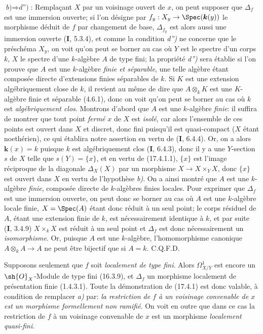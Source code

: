 $\textit{b)}\Rightarrow\textit{d'')}$: Remplaçant $X$ par un voisinage ouvert de $x$, on peut supposer que $\Delta_f$ est une immersion ouverte; si l'on désigne par $f_y:X_y\to\Spec(\boldsymbol{k}(y))$ le morphisme déduit de $f$ par changement de base, $\Delta_{f_y}$ est alors aussi une immersion ouverte (\textbf{I}, 5.3.4), et comme la condition \emph{d'')} ne concerne que le préschéma $X_y$, on voit qu'on peut se borner au cas où $Y$ est le spectre d'un corps $k$, $X$ le spectre d'une $k$-algèbre $A$ de type fini; la propriété \emph{d'')} sera établie si l'on prouve que $A$ est une $k$-algèbre \emph{finie et séparable}, une telle algèbre étant composée directe d'extensions finies séparables de $k$. Si $K$ est une extension algébriquement close de $k$, il revient au même de dire que $A\otimes_k K$ est une $K$-algèbre finie et séparable (4.6.1), donc on voit qu'on peut se borner au cas où $k$ est \emph{algébriquement clos}. Montrons d'abord que $A$ est une $k$-algèbre \emph{finie}: il suffira de montrer que tout point \emph{fermé} $x$ de $X$ est \emph{isolé}, car alors l'ensemble de ces points est ouvert dans $X$ et discret, donc fini puisqu'il est quasi-compact ($X$ étant noethérien), ce qui établira notre assertion en vertu de (\textbf{I}, 6.4.4). Or, on a alors $\boldsymbol{k}(x)=k$ puisque $k$ est algébriquement clos (\textbf{I}, 6.4.3), donc il y a une $Y$-section $s$ de $X$ telle que $s(Y)=\{x\}$, et en vertu de (17.4.1.1), $\{x\}$ est l'image réciproque de la diagonale $\Delta_X(X)$ par un morphisme $X\to X\times_Y X$, donc $\{x\}$ est ouvert dans $X$ en vertu de l'hypothèse \emph{b)}. On a ainsi montré que $A$ est une
$k$-algèbre \emph{finie}, composée directe de $k$-algèbres finies locales. Pour exprimer que $\Delta_f$ est une immersion ouverte, on peut donc se borner au cas où $A$ est une $k$-algèbre locale finie, $X=\Spec(A)$ étant donc réduit à un seul point; le corps résiduel de $A$, étant une extension finie de $k$, est nécessairement identique à $k$, et par suite (\textbf{I}, 3.4.9) $X\times_k X$ est réduit à un seul point et $\Delta_f$ est donc nécessairement un \emph{isomorphisme}. Or, puisque $A$ est une $k$-algèbre, l'homomorphisme canonique $A\otimes_k A\to A$ ne peut être bijectif que si $A=k$. C.Q.F.D.

\begin{remark}[17.4.1.2]
\label{IV.17.4.1.2}
Supposons seulement que $f$ soit \emph{localement de type fini}. Alors $\varOmega^1_{X/Y}$ est encore un $\sh{O}_X$-Module de type fini (16.3.9), et $\Delta_f$ un morphisme localement de présentation finie (1.4.3.1). Toute la démonstration de (17.4.1) est donc valable, à condition de remplacer \emph{a)} par: \emph{la restriction de $f$ à un voisinage convenable de $x$ est un morphisme formellement non ramifié}. On voit en outre que dans ce cas la restriction de $f$ à un voisinage convenable de $x$ est un morphisme \emph{localement quasi-fini}.
\end{remark}

